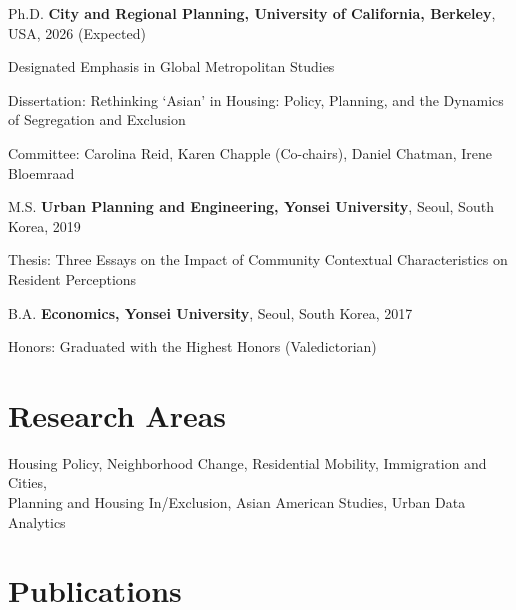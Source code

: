 \documentclass[12pt,letterpaper]{report}
\newcommand{\listitemspace}{0.4em}
\renewenvironment{itemize}
{\begin{list}{}{\setlength{\leftmargin}{0.5em}
                \setlength{\parskip}{0em}
                \setlength{\itemsep}{\listitemspace}
                \setlength{\parsep}{\listitemspace}}}
{\end{list}}
\begin{document}
    \begin{tablist}
      \item[Ph.D.] \tab{}\textbf{City and Regional Planning, University of California, Berkeley}, USA, 2026 (Expected)
        \item \tab{}Designated Emphasis in Global Metropolitan Studies
      \begin{itemize}
        \item Dissertation: Rethinking ‘Asian’ in Housing: Policy, Planning, and the Dynamics of Segregation and Exclusion
        \vspace{-0.6em}
        \item Committee: Carolina Reid, Karen Chapple (Co-chairs), Daniel Chatman, Irene Bloemraad
      \end{itemize}
      \item[M.S.] \tab{}\textbf{Urban Planning and Engineering, Yonsei University}, Seoul, South Korea, 2019
      \begin{itemize}
        \item Thesis: Three Essays on the Impact of Community Contextual Characteristics on Resident Perceptions
    \end{itemize}
      \item[B.A.] \tab{}\textbf{Economics, Yonsei University}, Seoul, South Korea, 2017
      \begin{itemize}
        \item Honors: Graduated with the Highest Honors (Valedictorian)
      \end{itemize}
    \end{tablist}
    
    \section*{Research Areas}
      Housing Policy, Neighborhood Change, Residential Mobility, Immigration and Cities,\\
      Planning and Housing In/Exclusion, Asian American Studies, Urban Data Analytics
  
    \section*{Publications}
\end{document}
